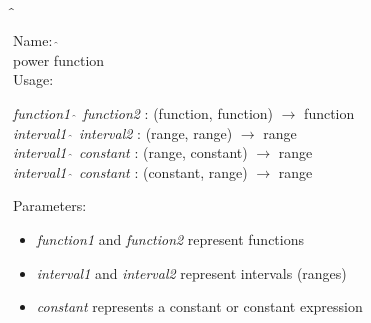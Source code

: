 \subsection{$\mathbf{\hat{~}}$}
\label{labpower}
\noindent Name: \textbf{$\mathbf{\hat{~}}$}\\
power function\\
\noindent Usage: 
\begin{center}
\emph{function1} \textbf{$\mathbf{\hat{~}}$} \emph{function2} : (\textsf{function}, \textsf{function}) $\rightarrow$ \textsf{function}\\
\emph{interval1} \textbf{$\mathbf{\hat{~}}$} \emph{interval2} : (\textsf{range}, \textsf{range}) $\rightarrow$ \textsf{range}\\
\emph{interval1} \textbf{$\mathbf{\hat{~}}$} \emph{constant} : (\textsf{range}, \textsf{constant}) $\rightarrow$ \textsf{range}\\
\emph{interval1} \textbf{$\mathbf{\hat{~}}$} \emph{constant} : (\textsf{constant}, \textsf{range}) $\rightarrow$ \textsf{range}\\
\end{center}
Parameters: 
\begin{itemize}
\item \emph{function1} and \emph{function2} represent functions
\item \emph{interval1} and \emph{interval2} represent intervals (ranges)
\item \emph{constant} represents a constant or constant expression
\end{itemize}

